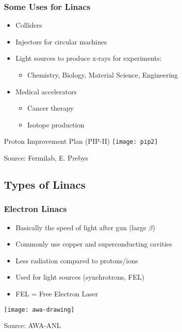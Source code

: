 \documentclass[professionalfonts,t]{beamer}
\begin{document}
\begin{frame}
\frametitle{Some Uses for Linacs}
\vspace{-1em}
\begin{minipage}{0.45\textwidth}
	\begin{itemize}
		\item Colliders 
		\item Injectors for circular machines
		\item Light sources to produce x-rays for experiments:
		\begin{itemize}
			\item Chemistry, Biology, Material Science, Engineering
		\end{itemize}
		\item Medical accelerators 
		\begin{itemize}
			\item Cancer therapy 
			\item Isotope production
		\end{itemize}
	\end{itemize}
\end{minipage}\hfill
\begin{minipage}{0.5\textwidth}
	\centering
	\vspace{-1.5em}
	
	\small Proton Improvement Plan (PIP-II)
	\texttt{[image: pip2]}
	
	\vspace{-0.25em}
	Source: Fermilab, E. Prebys
\end{minipage}
\end{frame}


\subsection{Types of Linacs}
\begin{frame}[containsverbatim]
\frametitle{Electron Linacs}
\begin{itemize}
	\item Basically the speed of light after gun (large $\beta$)
	\item Commonly use copper and superconducting cavities
	\item Less radiation compared to protons/ions
	\item Used for light sources (synchrotrons, FEL)
	\item FEL = Free Electron Laser
\end{itemize}

\texttt{[image: awa-drawing]}

\hfill Source: AWA-ANL
\end{frame}
\end{document}

